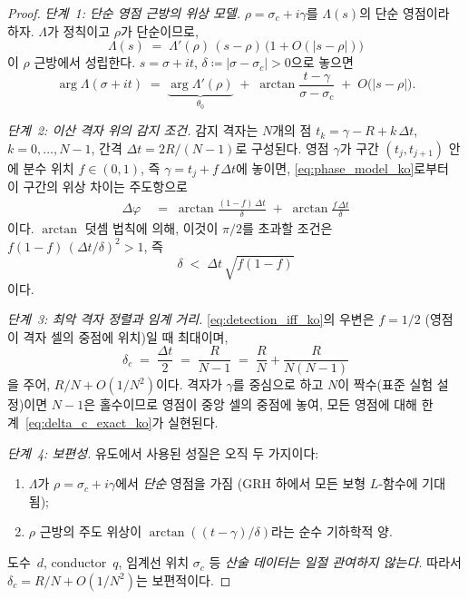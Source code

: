 \documentclass[11pt, a4paper]{article}
\theoremstyle{definition}
\theoremstyle{plain}
\begin{document}
\begin{proof}
\emph{단계~1: 단순 영점 근방의 위상 모델.}\;
$\rho = \sigma_c + i\gamma$를 $\Lambda(s)$의 단순 영점이라 하자.
$\Lambda$가 정칙이고 $\rho$가 단순이므로,
\[
  \Lambda(s) \;=\; \Lambda'(\rho)\,(s - \rho)\,\bigl(1 + O(|s-\rho|)\bigr)
\]
이 $\rho$ 근방에서 성립한다. $s = \sigma + it$, $\delta \coloneqq |\sigma - \sigma_c| > 0$으로 놓으면
\begin{equation}
  \arg \Lambda(\sigma + it)
  \;=\;
  \underbrace{\arg \Lambda'(\rho)}_{\theta_0}
  \;+\;
  \arctan\!\frac{t - \gamma}{\sigma - \sigma_c}
  \;+\;
  O\!\bigl(|s - \rho|\bigr).
  \label{eq:phase_model_ko}
\end{equation}

\smallskip\noindent
\emph{단계~2: 이산 격자 위의 감지 조건.}\;
감지 격자는 $N$개의 점
$t_k = \gamma - R + k\,\Delta t$, $k = 0,\dots,N{-}1$,
간격 $\Delta t = 2R/(N{-}1)$로 구성된다.
영점 $\gamma$가 구간 $(t_j, t_{j+1})$ 안에 분수 위치 $f \in (0,1)$,
즉 $\gamma = t_j + f\,\Delta t$에 놓이면,
\eqref{eq:phase_model_ko}로부터 이 구간의 위상 차이는 주도항으로
\begin{align}
  \Delta\varphi
  &\;=\;
  \arctan\!\frac{(1{-}f)\,\Delta t}{\delta}
  \;+\;
  \arctan\!\frac{f\,\Delta t}{\delta}
  \label{eq:phase_diff_ko}
\end{align}
이다. $\arctan$ 덧셈 법칙에 의해, 이것이 $\pi/2$를 초과할 조건은
$f(1{-}f)\,(\Delta t/\delta)^2 > 1$, 즉
\begin{equation}
  \delta \;<\; \Delta t\,\sqrt{f(1{-}f)}
  \label{eq:detection_iff_ko}
\end{equation}
이다.

\smallskip\noindent
\emph{단계~3: 최악 격자 정렬과 임계 거리.}\;
\eqref{eq:detection_iff_ko}의 우변은 $f = 1/2$
(영점이 격자 셀의 중점에 위치)일 때 최대이며,
\begin{equation}
  \delta_c
  \;=\;
  \frac{\Delta t}{2}
  \;=\;
  \frac{R}{N - 1}
  \;=\;
  \frac{R}{N} + \frac{R}{N(N{-}1)}
  \label{eq:delta_c_exact_ko}
\end{equation}
을 주어, $R/N + O(1/N^2)$이다.
격자가 $\gamma$를 중심으로 하고 $N$이 짝수(표준 실험 설정)이면
$N{-}1$은 홀수이므로 영점이 중앙 셀의 중점에 놓여,
모든 영점에 대해 한계~\eqref{eq:delta_c_exact_ko}가 실현된다.

\smallskip\noindent
\emph{단계~4: 보편성.}\;
유도에서 사용된 성질은 오직 두 가지이다:
\begin{enumerate}
  \item[(a)] $\Lambda$가 $\rho = \sigma_c + i\gamma$에서
    \emph{단순} 영점을 가짐 (GRH 하에서 모든 보형 $L$-함수에 기대됨);
  \item[(b)] $\rho$ 근방의 주도 위상이
    $\arctan((t{-}\gamma)/\delta)$라는 순수 기하학적 양.
\end{enumerate}
도수~$d$, conductor~$q$, 임계선 위치 $\sigma_c$ 등
\emph{산술 데이터는 일절 관여하지 않는다.}
따라서 $\delta_c = R/N + O(1/N^2)$는 보편적이다.


\end{proof}
\end{document}

